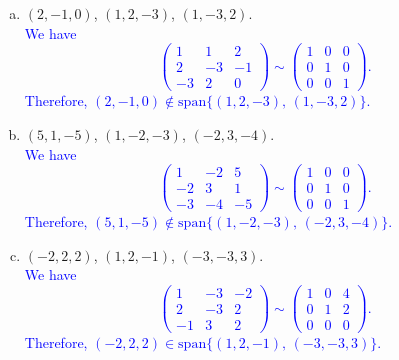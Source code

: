 \documentclass[a4paper,11pt]{article}
\newcommand{\BB}[1]{\textcolor{blue}{#1}}
\begin{document}
\begin{enumerate}[(a)]
\item $(2,-1,0)$, $(1,2,-3)$, $(1,-3,2)$. \\

  \BB{We have
    \[
      \left(
        \begin{array}{rr|r}
          1 & 1 & 2 \\
          2 & -3 & -1 \\
          -3 & 2 & 0
        \end{array}
      \right) 
      \sim
      \left(
        \begin{array}{rr|r}
          1 & 0 & 0 \\
          0 & 1 & 0 \\
          0 & 0 & 1
        \end{array}
      \right).
    \]
    Therefore, $(2,-1,0) \notin \text{span}\{(1,2,-3),\,(1,-3,2)\}$. \\
  }
  
\item $(5,1,-5)$, $(1,-2,-3)$, $(-2,3,-4)$. \\

  \BB{We have
    \[
      \left(
        \begin{array}{rr|r}
          1 & -2 & 5 \\
          -2 & 3 & 1 \\
          -3 & -4 & -5
        \end{array}
      \right) 
      \sim
      \left(
        \begin{array}{rr|r}
          1 & 0 & 0 \\
          0 & 1 & 0 \\
          0 & 0 & 1
        \end{array}
      \right).
    \]
    Therefore, $(5,1,-5) \notin \text{span}\{(1,-2,-3),\,(-2,3,-4)\}$. \\
  }
  
\item $(-2,2,2)$, $(1,2,-1)$, $(-3,-3,3)$. \\

  \BB{We have
    \[
      \left(
        \begin{array}{rr|r}
          1 & -3 & -2 \\
          2 & -3 & 2 \\
          -1 & 3 & 2
        \end{array}
      \right) 
      \sim
      \left(
        \begin{array}{rr|r}
          1 & 0 & 4 \\
          0 & 1 & 2 \\
          0 & 0 & 0
        \end{array}
      \right).
    \]
    Therefore, $(-2,2,2) \in \text{span}\{(1,2,-1),\,(-3,-3,3)\}$. \\
  }
\end{enumerate}
\end{document}
